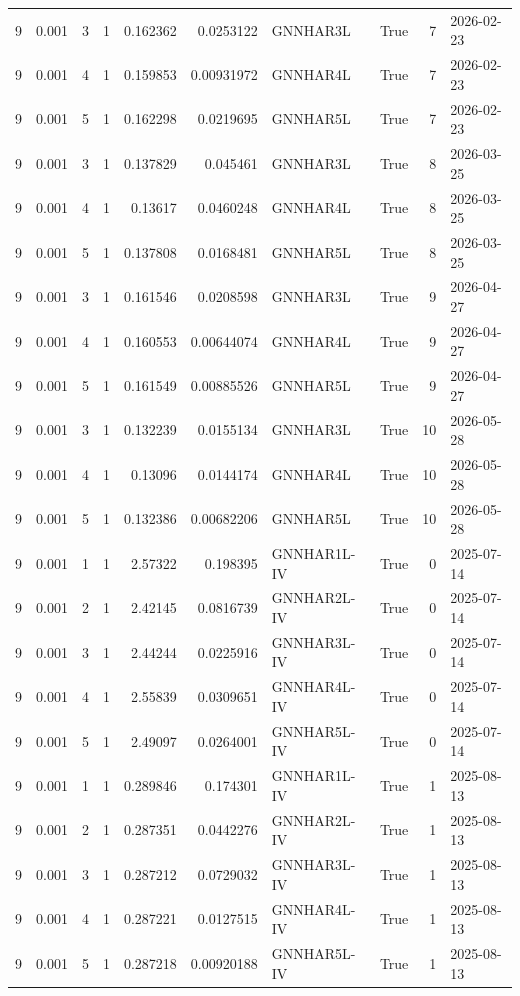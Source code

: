 \begin{tabular}{rrrrrrlrrl}
9 & 0.001 & 3 & 1 & 0.162362 & 0.0253122 & GNNHAR3L & True & 7 & 2026-02-23 \\
9 & 0.001 & 4 & 1 & 0.159853 & 0.00931972 & GNNHAR4L & True & 7 & 2026-02-23 \\
9 & 0.001 & 5 & 1 & 0.162298 & 0.0219695 & GNNHAR5L & True & 7 & 2026-02-23 \\
9 & 0.001 & 3 & 1 & 0.137829 & 0.045461 & GNNHAR3L & True & 8 & 2026-03-25 \\
9 & 0.001 & 4 & 1 & 0.13617 & 0.0460248 & GNNHAR4L & True & 8 & 2026-03-25 \\
9 & 0.001 & 5 & 1 & 0.137808 & 0.0168481 & GNNHAR5L & True & 8 & 2026-03-25 \\
9 & 0.001 & 3 & 1 & 0.161546 & 0.0208598 & GNNHAR3L & True & 9 & 2026-04-27 \\
9 & 0.001 & 4 & 1 & 0.160553 & 0.00644074 & GNNHAR4L & True & 9 & 2026-04-27 \\
9 & 0.001 & 5 & 1 & 0.161549 & 0.00885526 & GNNHAR5L & True & 9 & 2026-04-27 \\
9 & 0.001 & 3 & 1 & 0.132239 & 0.0155134 & GNNHAR3L & True & 10 & 2026-05-28 \\
9 & 0.001 & 4 & 1 & 0.13096 & 0.0144174 & GNNHAR4L & True & 10 & 2026-05-28 \\
9 & 0.001 & 5 & 1 & 0.132386 & 0.00682206 & GNNHAR5L & True & 10 & 2026-05-28 \\
9 & 0.001 & 1 & 1 & 2.57322 & 0.198395 & GNNHAR1L-IV & True & 0 & 2025-07-14 \\
9 & 0.001 & 2 & 1 & 2.42145 & 0.0816739 & GNNHAR2L-IV & True & 0 & 2025-07-14 \\
9 & 0.001 & 3 & 1 & 2.44244 & 0.0225916 & GNNHAR3L-IV & True & 0 & 2025-07-14 \\
9 & 0.001 & 4 & 1 & 2.55839 & 0.0309651 & GNNHAR4L-IV & True & 0 & 2025-07-14 \\
9 & 0.001 & 5 & 1 & 2.49097 & 0.0264001 & GNNHAR5L-IV & True & 0 & 2025-07-14 \\
9 & 0.001 & 1 & 1 & 0.289846 & 0.174301 & GNNHAR1L-IV & True & 1 & 2025-08-13 \\
9 & 0.001 & 2 & 1 & 0.287351 & 0.0442276 & GNNHAR2L-IV & True & 1 & 2025-08-13 \\
9 & 0.001 & 3 & 1 & 0.287212 & 0.0729032 & GNNHAR3L-IV & True & 1 & 2025-08-13 \\
9 & 0.001 & 4 & 1 & 0.287221 & 0.0127515 & GNNHAR4L-IV & True & 1 & 2025-08-13 \\
9 & 0.001 & 5 & 1 & 0.287218 & 0.00920188 & GNNHAR5L-IV & True & 1 & 2025-08-13 \\

\end{tabular}
